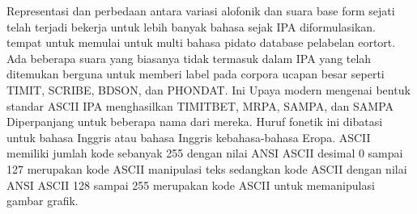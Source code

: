 	Representasi dan perbedaan antara variasi alofonik dan suara base form sejati telah terjadi
	bekerja untuk lebih banyak bahasa sejak IPA diformulasikan. 
	tempat untuk memulai untuk multi bahasa pidato database pelabelan eortort.
	Ada beberapa suara yang biasanya tidak termasuk dalam IPA yang telah ditemukan
	berguna untuk memberi label pada corpora ucapan besar seperti TIMIT, SCRIBE, BDSON, dan PHONDAT. Ini
	Upaya modern mengenai bentuk standar ASCII IPA menghasilkan TIMITBET, MRPA, SAMPA, dan
	SAMPA Diperpanjang untuk beberapa nama dari mereka. Huruf fonetik ini dibatasi untuk bahasa Inggris atau bahasa Inggris kebahasa-bahasa Eropa.
	ASCII memiliki jumlah kode sebanyak 255 dengan nilai ANSI ASCII desimal 0 sampai 127 merupakan kode ASCII manipulasi teks sedangkan kode ASCII dengan nilai ANSI ASCII 128 sampai 255 merupakan kode ASCII untuk memanipulasi gambar grafik.
